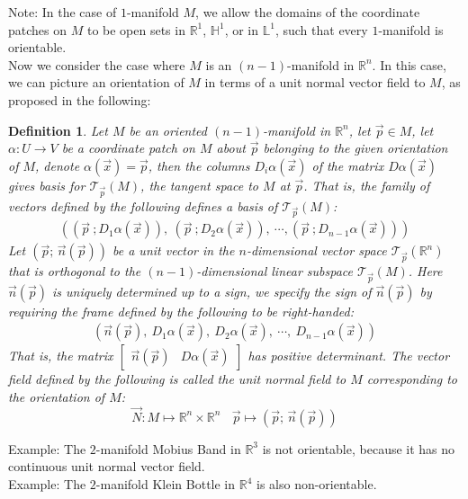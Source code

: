 \documentclass[15pt]{book}
\theoremstyle{break}
\theoremstyle{break}
\newtheorem{defn}{Definition}[corL]
\newcommand{\R}{\mathbb{R}}
\newcommand{\T}{\mathcal{T}}
\newcommand{\bmat}[1]{\begin{bmatrix} #1 \end{bmatrix}}
\newcommand{\note}{\color{red}Note: \color{black}}
\newcommand{\example}{\color{green}Example: \color{black}}
\begin{document}
\note In the case of $1$-manifold $M$, we allow the domains of the coordinate patches on $M$ to be open sets in $\R^1$, $\mathbb{H}^1$, or in $\mathbb{L}^1$, such that every $1$-manifold is orientable.\\

\hfill\break
Now we consider the case where $M$ is an $(n-1)$-manifold in $\R^n$. In this case, we can picture an orientation of $M$ in terms of a unit normal vector field to $M$, as proposed in the following:
\begin{defn}
Let $M$ be an oriented $(n-1)$-manifold in $\R^n$, let $\vec{p} \in M$, let $\alpha:U \to V$ be a coordinate patch on $M$ about $\vec{p}$ belonging to the given orientation of $M$, denote $\alpha(\vec{x}) = \vec{p}$, then the columns $D_i\alpha(\vec{x})$ of the matrix $D\alpha(\vec{x})$ gives basis for $\T_{\vec{p}}(M)$, the tangent space to $M$ at $\vec{p}$. That is, the family of vectors defined by the following defines a basis of $\T_{\vec{p}}(M)$:
\begin{align*}
\left(\left(\vec{p}\ ; D_1\alpha(\vec{x})\right),\ \left(\vec{p}\ ; D_2\alpha(\vec{x})\right),\ \cdots, \left(\vec{p}\ ; D_{n-1}\alpha(\vec{x})\right)\right)
\end{align*}
Let $(\vec{p};\, \vec{n}(\vec{p}))$ be a unit vector in the $n$-dimensional vector space $\T_{\vec{p}}(\R^n)$ that is orthogonal to the $(n-1)$-dimensional linear subspace $\T_{\vec{p}}(M)$. Here $\vec{n}(\vec{p})$ is uniquely determined up to a sign, we specify the sign of $\vec{n}(\vec{p})$ by requiring the frame defined by the following to be right-handed:
\begin{align*}
\left(\vec{n}(\vec{p}),\ D_1\alpha(\vec{x}),\ D_2\alpha(\vec{x}),\ \cdots,\ D_{n-1}\alpha(\vec{x})\right)
\end{align*}
That is, the matrix $\bmat{\vec{n}(\vec{p})& D\alpha(\vec{x})}$ has positive determinant.  The vector field defined by the following is called the unit normal field to $M$ corresponding to the orientation of $M$:
$$\vec{N}:M \mapsto \R^n\times \R^n \ \ \ \ \vec{p}\mapsto (\vec{p};\, \vec{n}(\vec{p}))$$
\end{defn}
 
\example The $2$-manifold Mobius Band in $\R^3$ is not orientable, because it has no continuous unit normal vector field. \\

\example The $2$-manifold Klein Bottle in $\R^4$ is also non-orientable. \\
\end{document}
